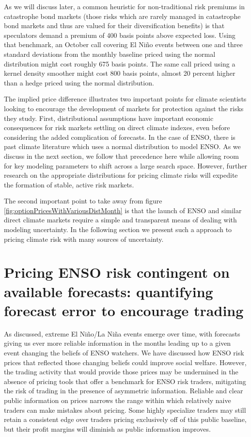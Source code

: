 \documentclass[authoryear]{article}
\begin{document}
As we will discuss later, a common heuristic for non-traditional risk premiums in catastrophe bond markets (those risks which are rarely managed in catastrophe bond markets and thus are valued for their diversification benefits) is that speculators demand a premium of 400 basis points above expected loss. Using that benchmark, an October call covering El Ni\~no events between one and three standard deviations from the monthly baseline priced using the normal distribution might cost roughly 675 basis points. The same call priced using a kernel density smoother might cost 800 basis points, almost 20 percent higher than a hedge priced using the normal distribution. 

The implied price difference illustrates two important points for climate scientists looking to encourage the development of markets for protection against the risks they study. First, distributional assumptions have important economic consequences for risk markets settling on direct climate indexes, even before considering the added complication of forecasts. In the case of ENSO, there is past climate literature which uses a normal distribution to model ENSO. As we discuss in the next section, we follow that precedence here while allowing room for key modeling parameters to shift across a large search space. However, further research on the appropriate distributions for pricing climate risks will expedite the formation of stable, active risk markets.

The second important point to take away from figure \ref{fig:optionPricesWithVariousDistMonth} is that the launch of ENSO and similar direct climate markets require a simple and transparent means of dealing with modeling uncertainty. In the following section we present such a approach to pricing climate risk with many sources of uncertainty.

\section{Pricing ENSO risk contingent on available forecasts: quantifying forecast error to encourage trading}
As discussed, extreme El Ni\~no/La Ni\~na events emerge over time, with forecasts giving us ever more reliable information in the months leading up to a given event changing the beliefs of ENSO watchers. We have discussed how ENSO risk prices that reflected those changing beliefs  could improve social welfare. However, the trading activity that would provide those prices may be undermined in the absence of pricing tools that offer a benchmark for ENSO risk traders, mitigating the risk of trading in the presence of asymmetric information. Reliable and clear public information on prices narrows the range within which relatively naive traders can make mistakes about pricing. Some highly specialize traders may still retain a consistent edge over traders pricing exclusively off of this public baseline, but their profit margins will diminish as public information improves.
\end{document}
